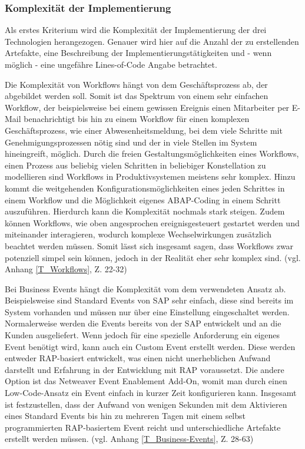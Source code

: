 \subsubsection{Komplexität der Implementierung}

Als erstes Kriterium wird die Komplexität der Implementierung der drei Technologien herangezogen. Genauer wird hier auf die Anzahl der zu erstellenden Artefakte, eine Beschreibung der Implementierungstätigkeiten und - wenn möglich - eine ungefähre Lines-of-Code Angabe betrachtet.

Die Komplexität von Workflows hängt von dem Geschäftsprozess ab, der abgebildet werden soll. Somit ist das Spektrum von einem sehr einfachen Workflow, der beispielsweise bei einem gewissen Ereignis einen Mitarbeiter per E-Mail benachrichtigt bis hin zu einem Workflow für einen komplexen Geschäftsprozess, wie einer Abwesenheitsmeldung, bei dem viele Schritte mit Genehmigungsprozessen nötig sind und der in viele Stellen im System hineingreift, möglich. Durch die freien Gestaltungsmöglichkeiten eines Workflows, einen Prozess aus beliebig vielen Schritten in beliebiger Konstellation zu modellieren sind Workflows in Produktivsystemen meistens sehr komplex. Hinzu kommt die weitgehenden Konfigurationsmöglichkeiten eines jeden Schrittes in einem Workflow und die Möglichkeit eigenes ABAP-Coding in einem Schritt auszuführen. Hierdurch kann die Komplexität nochmals stark steigen. Zudem können Workflows, wie oben angesprochen ereignisgesteuert gestartet werden und miteinander interagieren, wodurch komplexe Wechselwirkungen zusätzlich beachtet werden müssen. Somit lässt sich insgesamt sagen, dass Workflows zwar potenziell simpel sein können, jedoch in der Realität eher sehr komplex sind. (vgl. Anhang \ref{T_Workflows}, Z. 22-32)

Bei Business Events hängt die Komplexität vom dem verwendeten Ansatz ab. Beispielsweise sind Standard Events von SAP sehr einfach, diese sind bereits im System vorhanden und müssen nur über eine Einstellung eingeschaltet werden. Normalerweise werden die Events bereits von der SAP entwickelt und an die Kunden ausgeliefert. Wenn jedoch für eine spezielle Anforderung ein eigenes Event benötigt wird, kann auch ein Custom Event erstellt werden. Diese werden entweder RAP-basiert entwickelt, was einen nicht unerheblichen Aufwand darstellt und Erfahrung in der Entwicklung mit RAP voraussetzt. Die andere Option ist das Netweaver Event Enablement Add-On, womit man durch einen Low-Code-Ansatz ein Event einfach in kurzer Zeit konfigurieren kann. Insgesamt ist festzustellen, dass der Aufwand von wenigen Sekunden mit dem Aktivieren eines Standard Events bis hin zu mehreren Tagen mit einem selbst programmierten RAP-basiertem Event reicht und unterschiedliche Artefakte erstellt werden müssen. (vgl. Anhang \ref{T_Business-Events}, Z. 28-63)

